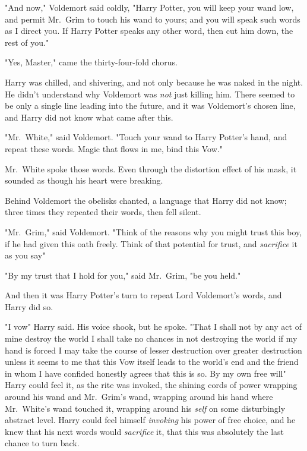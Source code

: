 "And now," Voldemort said coldly, "Harry Potter, you will keep your wand low,
and permit Mr.~Grim to touch his wand to yours; and you will speak such words
as I direct you. If Harry Potter speaks any other word, then cut him down, the
rest of you."

"Yes, Master," came the thirty-four-fold chorus.

Harry was chilled, and shivering, and not only because he was naked in the
night. He didn't understand why Voldemort was \emph{not} just killing him.
There seemed to be only a single line leading into the future, and it was
Voldemort's chosen line, and Harry did not know what came after this.

"Mr.~White," said Voldemort. "Touch your wand to Harry Potter's hand, and
repeat these words. Magic that flows in me, bind this Vow."

Mr.~White spoke those words. Even through the distortion effect of his mask, it
sounded as though his heart were breaking.

Behind Voldemort the obelisks chanted, a language that Harry did not know;
three times they repeated their words, then fell silent.

"Mr.~Grim," said Voldemort. "Think of the reasons why you might trust this boy,
if he had given this oath freely. Think of that potential for trust, and
\emph{sacrifice} it as you say{\el}"

"By my trust that I hold for you," said Mr.~Grim, "be you held."

And then it was Harry Potter's turn to repeat Lord Voldemort's words, and Harry
did so.

"I vow{\el}" Harry said. His voice shook, but he spoke. "That I shall
not{\el} by any act of mine{\el} destroy the world{\el} I shall take
no chances{\el} in not destroying the world{\el} if my hand is
forced{\el} I may take the course{\el} of lesser destruction over greater
destruction{\el} unless it seems to me that this Vow itself{\el} leads to
the world's end{\el} and the friend{\el} in whom I have confided
honestly{\el} agrees that this is so. By my own free will{\el}" Harry
could feel it, as the rite was invoked, the shining cords of power wrapping
around his wand and Mr.~Grim's wand, wrapping around his hand where Mr.~White's
wand touched it, wrapping around his \emph{self} on some disturbingly abstract
level. Harry could feel himself \emph{invoking} his power of free choice, and
he knew that his next words would \emph{sacrifice} it, that this was absolutely
the last chance to turn back.


